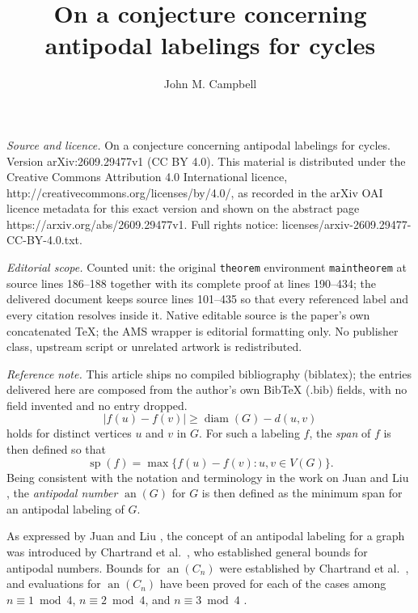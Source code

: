 \documentclass[10pt,a4paper]{amsart}
\begin{document}
\title[On a conjecture concerning antipodal labelings for cycles]{On a conjecture concerning antipodal labelings for cycles}
\author{John M. Campbell}
\date{}
\maketitle
\noindent\emph{Source and licence.} On a conjecture concerning antipodal labelings for cycles. Version arXiv:2609.29477v1 (CC BY 4.0). This material is distributed under the Creative Commons Attribution 4.0 International licence, http://creativecommons.org/licenses/by/4.0/, as recorded in the arXiv OAI licence metadata for this exact version and shown on the abstract page https://arxiv.org/abs/2609.29477v1. Full rights notice: licenses/arxiv-2609.29477-CC-BY-4.0.txt.\par\smallskip
\noindent\textit{Editorial scope.} Counted unit: the original \texttt{theorem} environment \texttt{maintheorem} at source lines 186--188 together with its complete proof at lines 190--434; the delivered document keeps source lines 101--435 so that every referenced label and every citation resolves inside it. Native editable source is the paper's own concatenated TeX; the AMS wrapper is editorial formatting only. No publisher class, upstream script or unrelated artwork is redistributed.\par\smallskip\noindent\textit{Reference note.} This article ships no compiled bibliography (biblatex); the entries delivered here are composed from the author's own BibTeX (.bib) fields, with no field invented and no entry dropped.
\begin{equation}\label{antipodalcondition}
 |f(u) - f(v)| \geq \operatorname{diam}(G) - d(u, v)
\end{equation}
 holds for distinct vertices $u$ and $v$ in $G$. For such a labeling $f$, the \emph{span} of $f$ is then defined so that 
\begin{equation}\label{displayspan} 
 \operatorname{sp}(f) = \max\{ f(u) - f(v) : u, v \in V(G) \}. 
\end{equation} 
 Being consistent with the notation and terminology in the work on Juan and Liu \cite{JuanLiu2012}, 
 the \emph{antipodal number} $\operatorname{an}(G)$
 for $G$ is then defined as the minimum span for an antipodal labeling of $G$. 

 As expressed by Juan and Liu \cite{JuanLiu2012}, the concept of an antipodal labeling for a graph was introduced by Chartrand et al.\ 
 \cite{ChartrandErwinZhang2000,ChartrandErwinZhang2002}, who established general bounds for antipodal numbers. 
 Bounds for $\operatorname{an}(C_n)$ were established by Chartrand et al.\ \cite{ChartrandErwinZhang2000}, and evaluations for 
 $\operatorname{an}(C_{n})$ have been proved for each of the cases among
 $n \equiv 1 \bmod {4}$, 
 $n \equiv 2 \bmod {4}$, and 
 $n \equiv 3 \bmod {4}$ \cite{ChartrandErwinZhang2000,JuanLiu2012}.
\end{document}
